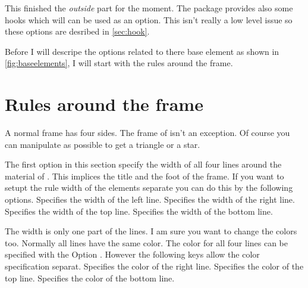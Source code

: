 \documentclass[openany,12pt,tocdepth=3]{ltx-md}
\begin{document}

\vspace*{\baselineskip}
This finished the \emph{outside} part for the moment. The package provides also some hooks
which will can be used as an option. This isn't really a low level issue so these
options are desribed in \autoref{sec:hook}. 

\vspace*{\baselineskip}
Before I will descripe the options related to there base element as shown in \autoref{fig:baseelements}, 
I will start with the rules around the frame.

\section{Rules around the frame}\label{sec:lines}
A normal frame has four sides. The frame of  isn't an exception. Of course
you can manipulate as possible to get a triangle or a star.

The first option in this section specify the width of all four lines around the material of .
This implices the title and the foot of the frame. If you want to setupt the rule width of the elements
separate you can do this by the following options.
Specifies the width of the left line.
Specifies the width of the right line.
Specifies the width of the top line.
Specifies the width of the bottom line.

The width is only one part of the lines. I am sure you want to change the colors too. 
Normally all lines have the same color. The color for all four lines can be specified 
with the Option . However the following keys allow the color
specification separat.
Specifies the color of the right line.
Specifies the color of the top line.
Specifies the color of the bottom line.

\end{document}
